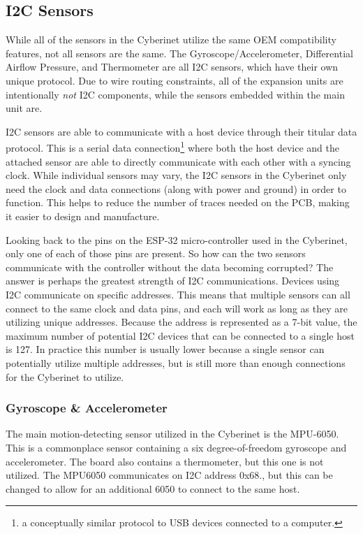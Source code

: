 \subsection{I2C Sensors}
While all of the sensors in the Cyberinet utilize the same OEM compatibility features, not all sensors are the same. The Gyroscope/Accelerometer, Differential Airflow Pressure, and Thermometer are all I2C sensors, which have their own unique protocol. Due to wire routing constraints, all of the expansion units are intentionally \emph{not} I2C components, while the sensors embedded within the main unit are.

I2C sensors are able to communicate with a host device through their titular data protocol. This is a serial data connection\footnote{a conceptually similar protocol to USB devices connected to a computer.} where both the host device and the attached sensor are able to directly communicate with each other with a syncing clock. While individual sensors may vary, the I2C sensors in the Cyberinet only need the clock and data connections (along with power and ground) in order to function. This helps to reduce the number of traces needed on the PCB, making it easier to design and manufacture.

Looking back to the pins on the ESP-32 micro-controller used in the Cyberinet, only one of each of those pins are present. So how can the two sensors communicate with the controller without the data becoming corrupted? The answer is perhaps the greatest strength of I2C communications. Devices using I2C communicate on specific addresses. This means that multiple sensors can all connect to the same clock and data pins, and each will work as long as they are utilizing unique addresses. Because the address is represented as a 7-bit value, the maximum number of potential I2C devices that can be connected to a single host is 127. In practice this number is usually lower because a single sensor can potentially utilize multiple addresses, but is still more than enough connections for the Cyberinet to utilize.


\subsubsection{Gyroscope \& Accelerometer}

The main motion-detecting sensor utilized in the Cyberinet is the MPU-6050. This is a commonplace sensor containing a six degree-of-freedom gyroscope and accelerometer. The board also contains a thermometer, but this one is not utilized. The MPU6050 communicates on I2C address 0x68., but this can be changed to allow for an additional 6050 to connect to the same host.

